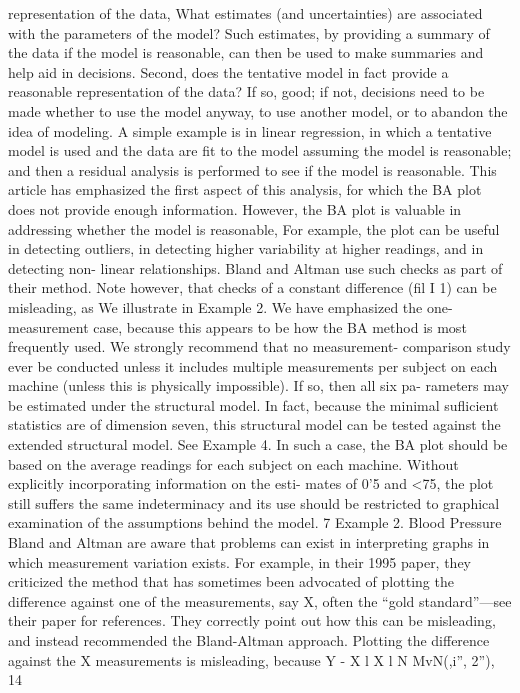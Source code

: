 representation of the data, What estimates (and uncertainties) are associated with the
parameters of the model? Such estimates, by providing a summary of the data if the
model is reasonable, can then be used to make summaries and help aid in decisions.
Second, does the tentative model in fact provide a reasonable representation of the
data? If so, good; if not, decisions need to be made whether to use the model anyway,
to use another model, or to abandon the idea of modeling. A simple example is in
linear regression, in which a tentative model is used and the data are ﬁt to the model
assuming the model is reasonable; and then a residual analysis is performed to see if
the model is reasonable.
This article has emphasized the ﬁrst aspect of this analysis, for which the BA plot
does not provide enough information. However, the BA plot is valuable in addressing
whether the model is reasonable, For example, the plot can be useful in detecting
outliers, in detecting higher variability at higher readings, and in detecting non-
linear relationships. Bland and Altman use such checks as part of their method.
Note however, that checks of a constant difference (ﬁl I 1) can be misleading, as We
illustrate in Example 2.
We have emphasized the one-measurement case, because this appears to be how
the BA method is most frequently used. We strongly recommend that no measurement-
comparison study ever be conducted unless it includes multiple measurements per
subject on each machine (unless this is physically impossible). If so, then all six pa-
rameters may be estimated under the structural model. In fact, because the minimal
suﬂicient statistics are of dimension seven, this structural model can be tested against
the extended structural model. See Example 4.
In such a case, the BA plot should be based on the average readings for each
subject on each machine. Without explicitly incorporating information on the esti-
mates of 0'5 and <75, the plot still suffers the same indeterminacy and its use should
be restricted to graphical examination of the assumptions behind the model.
7 Example 2. Blood Pressure
Bland and Altman are aware that problems can exist in interpreting graphs in which
measurement variation exists. For example, in their 1995 paper, they criticized the
method that has sometimes been advocated of plotting the difference against one of
the measurements, say X, often the “gold standard”—see their paper for references.
They correctly point out how this can be misleading, and instead recommended the
Bland-Altman approach.
Plotting the difference against the X measurements is misleading, because
Y - X
l X l N MvN(,i”, 2”),
14



